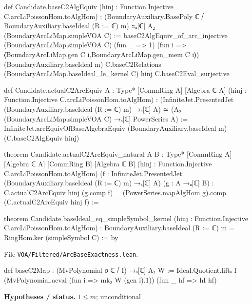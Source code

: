 \documentclass[11pt,openany]{book}
\newcommand{\leanpath}[1]{\texttt{\small #1}}
\theoremstyle{definition}
\theoremstyle{plain}
\begin{document}
\begin{leancode}
def Candidate.baseC2AlgEquiv
    (hinj : Function.Injective C.arcLiPoissonHom.toAlgHom) :
    (BoundaryAuxiliary.BasePoly ℂ ⧸ BoundaryAuxiliary.baseIdeal (R := ℂ) m) ≃ₐ[ℂ]
      A₂ (BoundaryArcLiMap.simpleVOA C) :=
  baseC2AlgEquiv_of_arc_injective (BoundaryArcLiMap.simpleVOA C) (fun _ => 1)
    (fun i => ⟨BoundaryArcLiMap.gen C i,BoundaryArcLiMap.gen_mem C i⟩)
    (BoundaryAuxiliary.baseIdeal m) C.baseC2Relations (BoundaryArcLiMap.baseIdeal_le_kernel C)
    hinj C.baseC2Eval_surjective

def Candidate.actualC2ArcEquiv {A : Type*} [CommRing A] [Algebra ℂ A]
    (hinj : Function.Injective C.arcLiPoissonHom.toAlgHom) :
    (InfiniteJet.PresentedJet (BoundaryAuxiliary.baseIdeal (R := ℂ) m) →ₐ[ℂ] A) ≃
      (A₂ (BoundaryArcLiMap.simpleVOA C) →ₐ[ℂ] PowerSeries A) :=
  InfiniteJet.arcEquivOfBaseAlgebraEquiv (BoundaryAuxiliary.baseIdeal m) (C.baseC2AlgEquiv hinj)

theorem Candidate.actualC2ArcEquiv_natural {A B : Type*} [CommRing A] [Algebra ℂ A]
    [CommRing B] [Algebra ℂ B] (hinj : Function.Injective C.arcLiPoissonHom.toAlgHom)
    (f : InfiniteJet.PresentedJet (BoundaryAuxiliary.baseIdeal (R := ℂ) m) →ₐ[ℂ] A)
    (g : A →ₐ[ℂ] B) :
    C.actualC2ArcEquiv hinj (g.comp f) =
      (PowerSeries.mapAlgHom g).comp (C.actualC2ArcEquiv hinj f) :=

theorem Candidate.baseIdeal_eq_simpleSymbol_kernel
    (hinj : Function.Injective C.arcLiPoissonHom.toAlgHom) :
    BoundaryAuxiliary.baseIdeal (R := ℂ) m = RingHom.ker (simpleSymbol C) := by
\end{leancode}
{\raggedright\noindent File \leanpath{VOA/\allowbreak Filtered/\allowbreak ArcBaseExactness.lean}.\par}
\begin{leancode}
def baseC2Map : (MvPolynomial σ ℂ ⧸ I) →ₐ[ℂ] A₂ W :=
  Ideal.Quotient.liftₐ I (MvPolynomial.aeval (fun i => mk₂ W (gen i).1)) (fun _ hf => hI hf)
\end{leancode}
\noindent\textbf{Hypotheses / status.} $1\le m$; unconditional\par
\medskip
\end{document}
